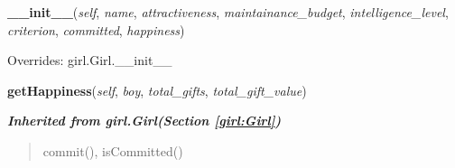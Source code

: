     \vspace{0.5ex}

\hspace{.8\funcindent}\begin{boxedminipage}{\funcwidth}

    \raggedright \textbf{\_\_init\_\_}(\textit{self}, \textit{name}, \textit{attractiveness}, \textit{maintainance\_budget}, \textit{intelligence\_level}, \textit{criterion}, \textit{committed}, \textit{happiness})

\setlength{\parskip}{2ex}
\setlength{\parskip}{1ex}
      Overrides: girl.Girl.\_\_init\_\_

    \end{boxedminipage}

    \label{girl:Desperate:getHappiness}

    \vspace{0.5ex}

\hspace{.8\funcindent}\begin{boxedminipage}{\funcwidth}

    \raggedright \textbf{getHappiness}(\textit{self}, \textit{boy}, \textit{total\_gifts}, \textit{total\_gift\_value})

\setlength{\parskip}{2ex}
\setlength{\parskip}{1ex}
    \end{boxedminipage}


\large{\textbf{\textit{Inherited from girl.Girl\textit{(Section \ref{girl:Girl})}}}}

\begin{quote}
commit(), isCommitted()
\end{quote}
